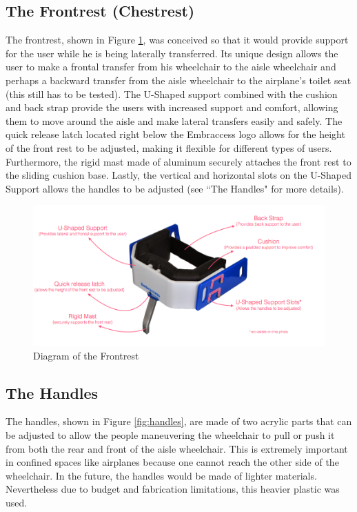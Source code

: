\subsection{The Frontrest (Chestrest)}
The frontrest, shown in Figure \ref{fig:frontrest},  was conceived so that it would provide support for the user while he is being laterally transferred. Its unique design allows the user to make a frontal transfer from his wheelchair to the aisle wheelchair and perhaps a backward transfer from the aisle wheelchair to the airplane's toilet seat (this still has to be tested). The U-Shaped support combined with the cushion and back strap provide the users with increased support and comfort, allowing them to move around the aisle and make lateral transfers easily and safely. The quick release latch located right below the Embraccess logo allows for the height of the front rest to be adjusted, making it flexible for different types of users. Furthermore, the rigid mast made of aluminum securely attaches the front rest to the sliding cushion base. Lastly, the vertical and horizontal slots on the U-Shaped Support allows the handles to be adjusted (see ``The Handles" for more details).

\begin{figure}[h]
\centering
\includegraphics[width=13cm]{images/AisleWheelchair6.png}
\caption{Diagram of the Frontrest}
\label{fig:frontrest}
\end{figure}

\subsection{The Handles}
The handles, shown in Figure \ref{fig:handles}, are made of two acrylic parts that can be adjusted to allow the people maneuvering the wheelchair to pull or push it from both the rear and front of the aisle wheelchair. This is extremely important in confined spaces like airplanes because one cannot reach the other side of the wheelchair. In the future,  the handles would be made of  lighter materials. Nevertheless due to budget and fabrication limitations, this heavier plastic was used.


